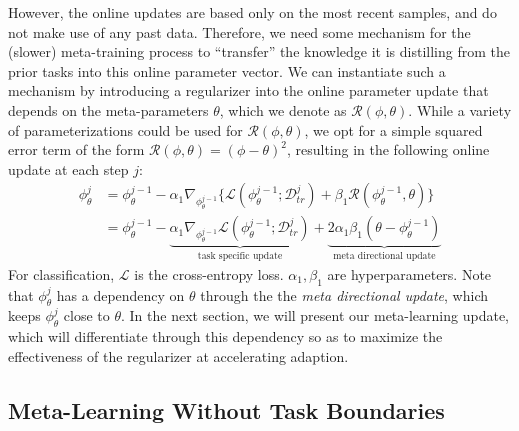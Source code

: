 However, the online updates are based only on the most recent  samples, and do not make use of any past data. Therefore, we need some mechanism for the (slower) meta-training process to ``transfer'' the knowledge it is distilling from the prior tasks into this online parameter vector. We can instantiate such a mechanism by introducing a regularizer into the online parameter update that depends on the meta-parameters $\theta$, which we denote as $\mathcal{R}(\phi,\theta)$. While a variety of parameterizations could be used for $\mathcal{R}(\phi,\theta)$, we opt for a simple squared error term of the form $\mathcal{R}(\phi,\theta) = (\phi - \theta)^2$, resulting in the following online update at each step $j$:
\begin{align*}
    \phi^j_{\theta} &= \phi^{j-1}_{\theta} - \alpha_1 \nabla_{\phi^{j-1}_{\theta}} \{ \mathcal{L}(\phi^{j-1}_{\theta}; \mathcal{D}^j_{tr}) + \beta_1 \mathcal{R}(\phi^{j-1}_{\theta}, \theta) \} \\
           &= \phi^{j-1}_{\theta} - \underbrace{\alpha_1 \nabla_{\phi^{j-1}_{\theta}}\mathcal{L}(\phi^{j-1}_{\theta}; \mathcal{D}^j_{tr})}_{ \text{task specific update}} + \underbrace{2\alpha_1\beta_1 (\theta - \phi^{j-1}_{\theta})}_{\text{meta directional update}}
\end{align*}
For classification, $\mathcal{L}$ is the cross-entropy loss. $\alpha_1, \beta_1$ are hyperparameters. Note that $\phi^j_{\theta}$ has a dependency on $\theta$ through the the \emph{meta directional update}, which keeps $\phi^j_{\theta}$ close to $\theta$. In the next section, we will present our meta-learning update, which will differentiate through this dependency so as to maximize the effectiveness of the regularizer at accelerating adaption.

\subsection{Meta-Learning Without Task Boundaries}
\label{sec:meta_updates}

